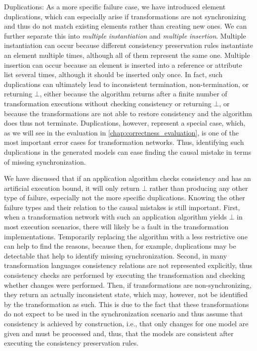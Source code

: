 \begin{properdescription}
    \item[Duplications:] %
    As a more specific failure case, we have introduced element duplications, which can especially arise if transformations are not synchronizing and thus do not match existing elements rather than creating new ones.
    We can further separate this into \emph{multiple instantiation} and \emph{multiple insertion}. 
    Multiple instantiation can occur because different consistency preservation rules instantiate an element multiple times, although all of them represent the same one.
    Multiple insertion can occur because an element is inserted into a reference or attribute list several times, although it should be inserted only once. 
    In fact, such duplications can ultimately lead to inconsistent termination, non-termination, or returning $\bot$, either because the algorithm returns after a finite number of transformation executions without checking consistency or returning $\bot$, or because the transformations are not able to restore consistency and the algorithm does thus not terminate.
    Duplications, however, represent a special case, which, as we will see in the evaluation in \autoref{chap:correctness_evaluation}, is one of the most important error cases for transformation networks.
    Thus, identifying such duplications in the generated models can ease finding the causal mistake in terms of missing synchronization.
\end{properdescription}

We have discussed that if an application algorithm checks consistency and has an artificial execution bound, it will only return $\bot$ rather than producing any other type of failure, especially not the more specific duplications. 
Knowing the other failure types and their relation to the causal mistakes is still important.
First, when a transformation network with such an application algorithm yields $\bot$ in most execution scenarios, there will likely be a fault in the transformation implementations.
Temporarily replacing the algorithm with a less restrictive one can help to find the reasons, because then, for example, duplications may be detectable that help to identify missing synchronization.
Second, in many transformation languages consistency relations are not represented explicitly, thus consistency checks are performed by executing the transformation and checking whether changes were performed.
Then, if transformations are non-synchronizing, they return an actually inconsistent state, which may, however, not be identified by the transformation as such.
This is due to the fact that these transformations do not expect to be used in the synchronization scenario and thus assume that consistency is achieved by construction, i.e., that only changes for one model are given and must be processed and, thus, that the models are consistent after executing the consistency preservation rules.



